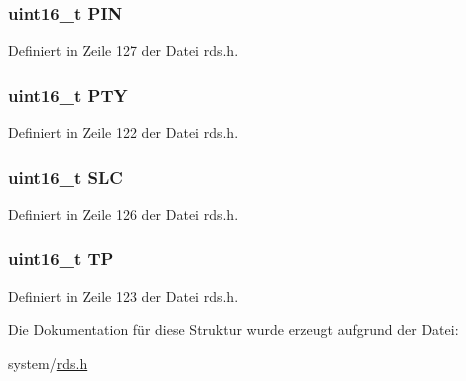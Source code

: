 \subsubsection[{P\+I\+N}]{\setlength{\rightskip}{0pt plus 5cm}uint16\+\_\+t P\+I\+N}\label{structgroup__1a_a23b9db30b873d9b45f435df66328a784}


Definiert in Zeile 127 der Datei rds.\+h.

\hypertarget{structgroup__1a_a0474967478fbbc2c71b800d2e0132d45}{}
\subsubsection[{P\+T\+Y}]{\setlength{\rightskip}{0pt plus 5cm}uint16\+\_\+t P\+T\+Y}\label{structgroup__1a_a0474967478fbbc2c71b800d2e0132d45}


Definiert in Zeile 122 der Datei rds.\+h.

\hypertarget{structgroup__1a_adeb94d897f554bdd08433c17155c53d2}{}
\subsubsection[{S\+L\+C}]{\setlength{\rightskip}{0pt plus 5cm}uint16\+\_\+t S\+L\+C}\label{structgroup__1a_adeb94d897f554bdd08433c17155c53d2}


Definiert in Zeile 126 der Datei rds.\+h.

\hypertarget{structgroup__1a_ab9e634c63b0d95a96716d5f6d7f06d72}{}
\subsubsection[{T\+P}]{\setlength{\rightskip}{0pt plus 5cm}uint16\+\_\+t T\+P}\label{structgroup__1a_ab9e634c63b0d95a96716d5f6d7f06d72}


Definiert in Zeile 123 der Datei rds.\+h.



Die Dokumentation für diese Struktur wurde erzeugt aufgrund der Datei\+:\begin{DoxyCompactItemize}
\item 
system/\hyperlink{rds_8h}{rds.\+h}\end{DoxyCompactItemize}
